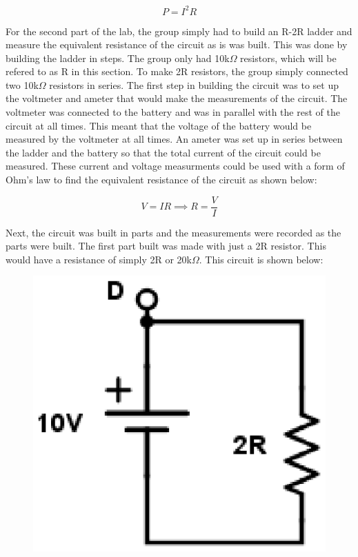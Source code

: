 \documentclass[twocolumn, amsmath]{revtex4}
\begin{document}
\begin{equation}
P = I^2R 
\end{equation}


For the second part of the lab, the group simply had to build an R-2R ladder and measure the equivalent resistance of the circuit as is was built. This was done by building the ladder in steps. The group only had 10k$\Omega$ resistors, which will be refered to as R in this section. To make 2R resistors, the group simply connected two 10k$\Omega$ resistors in series. The first step in building the circuit was to set up the voltmeter and ameter that would make the measurements of the circuit. The voltmeter was connected to the battery and was in parallel with the rest of the circuit at all times. This meant that the voltage of the battery would be measured by the voltmeter at all times. An ameter was set up in series between the ladder and the battery so that the total current of the circuit could be measured. These current and voltage measurments could be used with a form of Ohm's law to find the equivalent resistance of the circuit as shown below:

\begin{equation}
V = IR \implies R = \frac{V}{I}
\end{equation}

Next, the circuit was built in parts and the measurements were recorded as the parts were built. The first part built was made with just a 2R resistor. This would have a resistance of simply 2R or 20k$\Omega$. This circuit is shown below:

\begin{figure}[h]  

\includegraphics[scale = 0.4]{D.eps}  
\end{figure}
\end{document}
